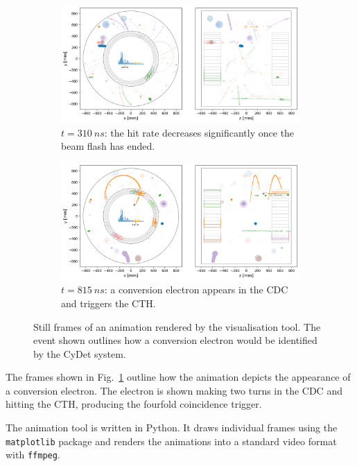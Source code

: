 \begin{figure}
    \begin{subfigure}[t]{0.49\textwidth}
    \centering
    \includegraphics[width=\textwidth]{chapter3/frame_067.png}
    \caption{$t=\SI{310}{ns}$: the hit rate decreases significantly once the beam flash has ended.}
    \end{subfigure}
    \hfill
    \begin{subfigure}[t]{0.49\textwidth}
    \centering
    \includegraphics[width=\textwidth]{chapter3/frame_192.png}
    \caption{$t=\SI{815}{ns}$: a conversion electron appears in the CDC and triggers the CTH.}
    \end{subfigure}
    
    \caption{Still frames of an animation rendered by the visualisation tool. The event shown outlines how a conversion electron would be identified by the CyDet system.}
    \label{fig:animation}
\end{figure}

The frames shown in Fig.~\ref{fig:animation} outline how the animation depicts the appearance of a conversion electron. The electron is shown making two turns in the CDC and hitting the CTH, producing the fourfold coincidence trigger.

The animation tool is written in Python. It draws individual frames using the \texttt{matplotlib} package and renders the animations into a standard video format with \texttt{ffmpeg}. 

